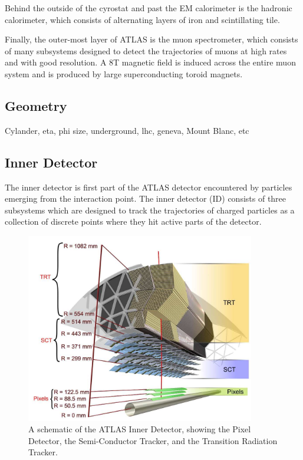 Behind the outside of the cyrostat and past the EM calorimeter is the hadronic calorimeter, which consists of alternating layers of iron and scintillating tile.

Finally, the outer-most layer of ATLAS is the muon spectrometer, which consists of many subsystems designed to detect the trajectories of muons at high rates and with good resolution. 
A 8T magnetic field is induced across the entire muon system and is produced by large superconducting toroid magnets.


\subsection{Geometry}
Cylander, eta, phi size, underground, lhc, geneva, Mount Blanc, etc


\subsection{Inner Detector}
The inner detector is first part of the ATLAS detector encountered by particles emerging from the interaction point.
The inner detector (ID) consists of three subsystems which are designed to track the trajectories of charged particles as a collection of discrete points where they hit active parts of the detector.

\begin{figure}
  \begin{center}
    \includegraphics[width=100mm]{figures/atlas/InnerDetector.jpg}
  \end{center}
  \caption{A schematic of the ATLAS Inner Detector, showing the Pixel Detector, the Semi-Conductor Tracker, and the Transition Radiation Tracker.}
  \label{img:InnerDetector}
\end{figure}



